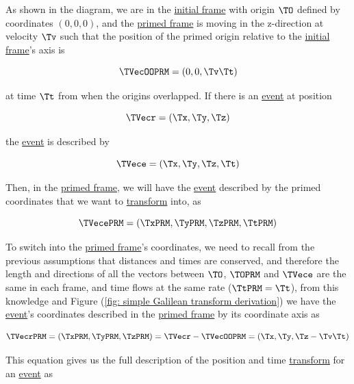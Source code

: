 As shown in the diagram, we are in the \hyperlink{def-initial-Frame}{initial frame} with origin ${\TO }$ defined by coordinates $(0,0,0)$, and the \hyperlink{def-Primed-Frame}{primed frame} is moving in the z-direction at velocity ${\Tv }$ such that the position of the primed origin relative to the \hyperlink{def-initial-Frame}{initial frame}'s axis is

\begin{equation}
	\TVecOOPRM  = (0,0,{\Tv }{\Tt })
\end{equation}

at time ${\Tt }$ from when the origins overlapped.
If there is an \hyperlink{def-event}{event} at position

\begin{equation}
	\TVecr  = ({\Tx },{\Ty },{\Tz })
\end{equation}

the \hyperlink{def-event}{event} is described by

\begin{equation}
	\TVece  = ({\Tx },{\Ty },{\Tz },{\Tt })
\end{equation}

Then, in the \hyperlink{def-Primed-Frame}{primed frame}, we will have the \hyperlink{def-event}{event} described by the primed coordinates that we want to \hyperlink{def-transform}{transform} into, as

\begin{equation}
	\TVecePRM  = ({\TxPRM  },{\TyPRM  },{\TzPRM  },\TtPRM )
\end{equation}

To switch into the \hyperlink{def-Primed-Frame}{primed frame}'s coordinates, we need to recall from the previous assumptions that distances and times are conserved, and therefore the length and directions of all the vectors between ${\TO }$, ${\TOPRM }$ and ${\TVece}$ are the same in each frame, and time flows at the same rate ($\TtPRM  = \Tt $), from this knowledge and Figure (\ref{fig: simple Galilean transform derivation}) we have the \hyperlink{def-event}{event}'s coordinates described in the \hyperlink{def-Primed-Frame}{primed frame} by its coordinate axis as

\begin{equation}
	{\TVecrPRM  } = ({\TxPRM  },{\TyPRM  },{\TzPRM  }) = \TVecr -\TVecOOPRM  = ({\Tx },{\Ty },{\Tz }-{\Tv }{\Tt })
	\label{eq: classical event}
\end{equation}

This equation gives us the full description of the position and time \hyperlink{def-transform}{transform} for an \hyperlink{def-event}{event} as

